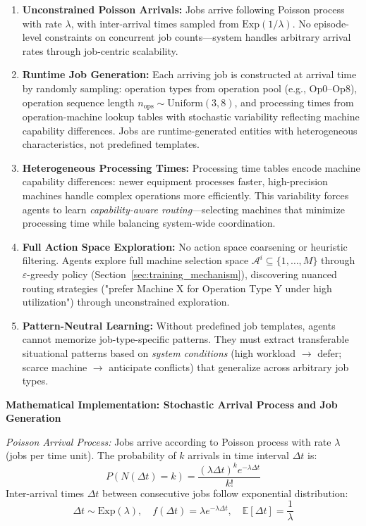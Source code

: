\begin{enumerate}
\item \textbf{Unconstrained Poisson Arrivals:} Jobs arrive following Poisson process with rate \( \lambda \), with inter-arrival times sampled from \( \text{Exp}(1/\lambda) \). No episode-level constraints on concurrent job counts—system handles arbitrary arrival rates through job-centric scalability.

\item \textbf{Runtime Job Generation:} Each arriving job is constructed at arrival time by randomly sampling: operation types from operation pool (e.g., Op0--Op8), operation sequence length \( n_{\text{ops}} \sim \text{Uniform}(3, 8) \), and processing times from operation-machine lookup tables with stochastic variability reflecting machine capability differences. Jobs are runtime-generated entities with heterogeneous characteristics, not predefined templates.

\item \textbf{Heterogeneous Processing Times:} Processing time tables encode machine capability differences: newer equipment processes faster, high-precision machines handle complex operations more efficiently. This variability forces agents to learn \textit{capability-aware routing}—selecting machines that minimize processing time while balancing system-wide coordination.

\item \textbf{Full Action Space Exploration:} No action space coarsening or heuristic filtering. Agents explore full machine selection space \( \mathcal{A}^i \subseteq \{1, \ldots, M\} \) through \( \varepsilon \)-greedy policy (Section~\ref{sec:training_mechanism}), discovering nuanced routing strategies ("prefer Machine X for Operation Type Y under high utilization") through unconstrained exploration.

\item \textbf{Pattern-Neutral Learning:} Without predefined job templates, agents cannot memorize job-type-specific patterns. They must extract transferable situational patterns based on \textit{system conditions} (high workload \( \rightarrow \) defer; scarce machine \( \rightarrow \) anticipate conflicts) that generalize across arbitrary job types.
\end{enumerate}

\textbf{Mathematical Implementation: Stochastic Arrival Process and Job Generation}

\textit{Poisson Arrival Process:} Jobs arrive according to Poisson process with rate \( \lambda \) (jobs per time unit). The probability of \( k \) arrivals in time interval \( \Delta t \) is:
\[
P(N(\Delta t) = k) = \frac{(\lambda \Delta t)^k e^{-\lambda \Delta t}}{k!}
\]
Inter-arrival times \( \Delta t \) between consecutive jobs follow exponential distribution:
\[
\Delta t \sim \text{Exp}(\lambda), \quad f(\Delta t) = \lambda e^{-\lambda \Delta t}, \quad \mathbb{E}[\Delta t] = \frac{1}{\lambda}
\]

